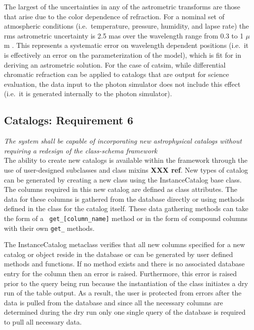 \documentclass[]{article}
\begin{document}
The largest of the uncertainties in any of the astrometric transforms
are those that arise due to the color dependence of refraction. For a
nominal set of atmospheric conditions (i.e.\ temperature, pressure,
humidity, and lapse rate) the rms astrometric uncertainty is 2.5 mas
over the wavelength range from 0.3 to 1 $\mu$m . This represents a
systematic error on wavelength dependent positions (i.e.\ it is
effectively an error on the parameterization of the model), which is
fit for in deriving an astrometric solution. For the case of catsim,
while differential chromatic refraction can be applied to catalogs
that are output for science evaluation, the data input to the photon
simulator does not include this effect (i.e.\ it is generated
internally to the photon simulator).

\subsection{Catalogs: Requirement 6}

{\it The system shall be capable of incorporating new astrophysical catalogs without requiring
a redesign of the class-schema framework}\\

The ability to create new catalogs is available within the framework
through the use of user-designed subclasses and class mixins {\bf XXX
  ref}. New types of catalog can be generated by creating a new class using
the InstanceCatalog base class. The columns required in this new catalog are defined
as class attributes. The data for these columns is gathered from the
database directly or using methods defined in the class for the
catalog itself. These data gathering methods can take the form of a {\tt
  get\_[column\_name]} method or in the form of compound columns with
their own {\tt get\_} methods. 

The InstanceCatalog metaclass verifies that all new columns specified
for a new catalog or object reside in the database or can be generated
by user defined methods and functions.  If no method exists and there
is no associated database entry for the column then an error is
raised. Furthermore, this error is raised prior to the query being run
because the instantiation of the class initiates a dry run of the
table output. As a result, the user is protected from errors after the
data is pulled from the database and since all the necessary columns
are determined during the dry run only one single query of the
database is required to pull all necessary data.
\end{document}
